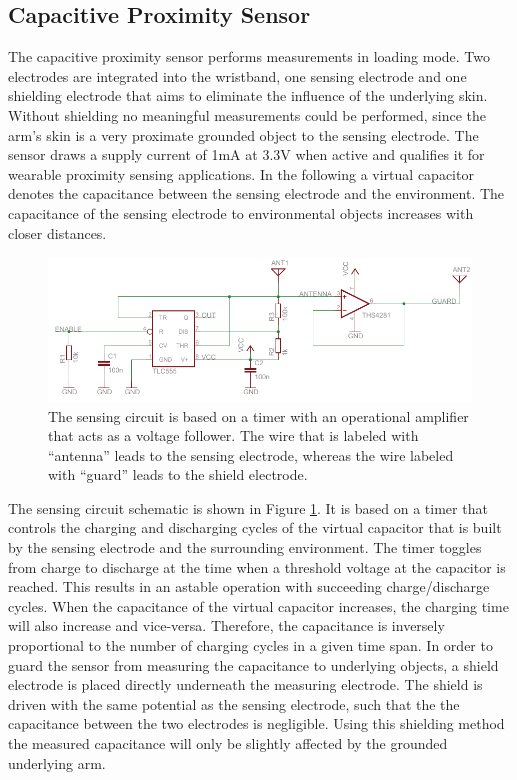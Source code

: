 \documentclass[runningheads,a4paper]{llncs}
\begin{document}
\subsection{Capacitive Proximity Sensor}

The capacitive proximity sensor performs measurements in loading mode. Two electrodes are integrated into the wristband, one sensing electrode and one shielding electrode that aims to eliminate the influence of the underlying skin. Without shielding no meaningful measurements could be performed, since the arm's skin is a very proximate grounded object to the sensing electrode. The sensor draws a supply current of 1mA at 3.3V when active and qualifies it for wearable proximity sensing applications. In the following a virtual capacitor denotes the capacitance between the sensing electrode and the environment. The capacitance of the sensing electrode to environmental objects increases with closer distances.

\begin{figure}
	\centering
		\includegraphics[width=1.00\textwidth]{Images/schematic.pdf}
	\caption{The sensing circuit is based on a timer with an operational amplifier that acts as a voltage follower. The wire that is labeled with ``antenna'' leads to the sensing electrode, whereas the wire labeled with ``guard'' leads to the shield electrode.}
	\label{fig:schematic}
\end{figure}

The sensing circuit schematic is shown in Figure \ref{fig:schematic}. It is based on a timer that controls the charging and discharging cycles of the virtual capacitor that is built by the sensing electrode and the surrounding environment. The timer toggles from charge to discharge at the time when a threshold voltage at the capacitor is reached. This results in an astable operation with succeeding charge/discharge cycles. When the capacitance of the virtual capacitor increases, the charging time will also increase and vice-versa. Therefore, the capacitance is inversely proportional to the number of charging cycles in a given time span. In order to guard the sensor from measuring the capacitance to underlying objects, a shield electrode is placed directly underneath the measuring electrode. The shield is driven with the same potential as the sensing electrode, such that the the capacitance between the two electrodes is negligible. Using this shielding method the measured capacitance will only be slightly affected by the grounded underlying arm.
\end{document}
